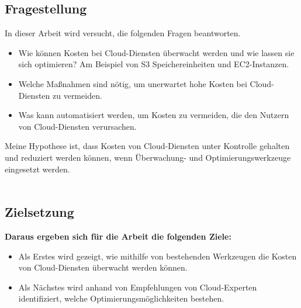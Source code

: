 \subsection{Fragestellung}
\begin{flushleft}
In dieser Arbeit wird versucht, die folgenden Fragen beantworten. 
\end{flushleft}

\begin{itemize}
    \item
        Wie können Kosten bei Cloud-Diensten überwacht werden und wie lassen sie sich optimieren? 
        Am Beispiel von S3 Speichereinheiten und EC2-Instanzen.
    \item
        Welche Maßnahmen sind nötig, um unerwartet hohe Kosten bei Cloud-Diensten zu vermeiden.
    \item 
        Was kann automatisiert werden, um Kosten zu vermeiden, die den Nutzern von Cloud-Diensten verursachen.  
\end{itemize}
Meine Hypothese ist, dass Kosten von Cloud-Diensten unter Kontrolle gehalten und
reduziert werden können, wenn Überwachung- und Optimierungswerkzeuge eingesetzt werden.
\\\\

\subsection{Zielsetzung}
\textbf{Daraus ergeben sich für die Arbeit die folgenden Ziele:}\\ 
\begin{itemize}
    \item
        Als Erstes wird gezeigt, wie mithilfe von bestehenden Werkzeugen  die Kosten von Cloud-Diensten überwacht werden können.
    \item
        Als Nächstes wird anhand von Empfehlungen von Cloud-Experten identifiziert, welche Optimierungsmöglichkeiten bestehen.\\
\end{itemize}


